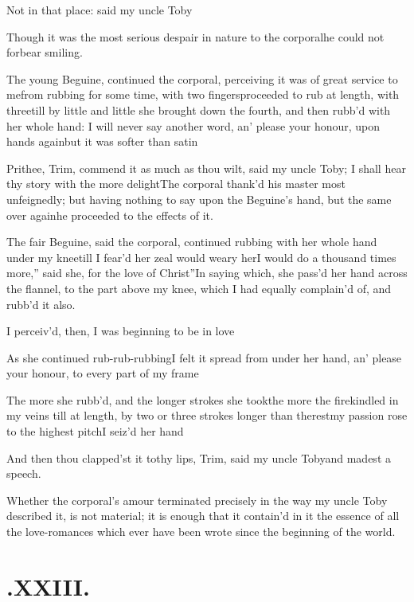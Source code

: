 \documentclass{article}
\begin{document}
\tsh Not in that place: said my uncle
Toby\tsh

Though it was the most serious des\-pair in nature to the
corporal\tsk he could not forbear smiling.

The young Beguine, continued the corporal, perceiving it
was of great service to me\tsk from rubbing for some time, with
two fingers\tsk proceeded to rub at length, with three\tsk till
by little and little she brought down the fourth, and then
rubb’d with her whole hand: I will never say another word,
an’ please your honour, upon hands again\tsk but it was
softer than satin\tsh

\tsh Prithee, Trim, commend it as much as thou
wilt, said my uncle Toby; I shall hear thy story with the
more delight\tsh The corporal thank’d his master
most unfeignedly; but having nothing to say upon the
Beguine’s hand, but the same over again\tsh he
proceeded to the effects of it.

\newpage
The fair Beguine, said the corporal, continued rubbing with her whole
hand under my knee\tsk till I fear’d her zeal would weary
her\tsh \lqq I would do a\break
\lqq thousand times more,” said she, \lqq for\break
\lqq the love of Christ”\tsh In saying which,\break
she pass’d her hand across the flannel, to the part above my
knee, which I had equally complain’d of, and rubb’d it also.


I perceiv’d, then, I was beginning to be in
love\tsh

As she continued rub-rub-rubbing\tsk I felt it spread from
under her hand, an’ please your honour, to every part of my
frame\tsh

The more she rubb’d, and the longer strokes she
took\tsh the more the fire\pb kindled in my veins \tsh till at length, by
two or three strokes longer than the\break rest\tsh my passion
rose to the highest pitch\tsh I seiz’d her
hand\tsh

\tsh And then thou clapped’st it to\break thy lips,
Trim, said my uncle Toby\tsh\break and madest a
speech.

Whether the corporal’s amour terminated precisely in the
way my uncle Toby described it, is not material; it is
enough that it contain'd in it the essence of all the love-romances
which ever have been wrote since the beginning of the world.

\newpage
\section{.\enspace XXIII.}
\end{document}
